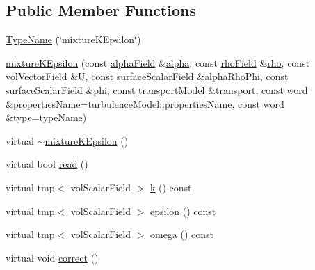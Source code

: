 \subsection*{Public Member Functions}
\begin{DoxyCompactItemize}
\item 
\hyperlink{classFoam_1_1RASModels_1_1mixtureKEpsilon_adbf46a734f80cfe0ac2e8257da209273}{Type\+Name} (\char`\"{}mixture\+K\+Epsilon\char`\"{})
\item 
\hyperlink{classFoam_1_1RASModels_1_1mixtureKEpsilon_a8a7ec1494a8e894fa723875426b4c21b}{mixture\+K\+Epsilon} (const \hyperlink{classFoam_1_1RASModels_1_1mixtureKEpsilon_a06a66094f33d6817d19225445c5ea874}{alpha\+Field} \&\hyperlink{UEqn__1pl_8H_a7fe02434a19f3e00e927f32adcbb193b}{alpha}, const \hyperlink{classFoam_1_1RASModels_1_1mixtureKEpsilon_a1dda906cfc9022335f0782a632302cd8}{rho\+Field} \&\hyperlink{EEqn__1pl_8H_ac955f87ac2b79f02f420cae087fc52b1}{rho}, const vol\+Vector\+Field \&\hyperlink{UEqn__1pl_8H_abe23fa3afe09cc511569a7dca4160561}{U}, const surface\+Scalar\+Field \&\hyperlink{updateAlphaPhiAndInitControls__1p_8H_adb16eab5a684ddb62e40a6ffdc2d646c}{alpha\+Rho\+Phi}, const surface\+Scalar\+Field \&phi, const \hyperlink{classFoam_1_1RASModels_1_1mixtureKEpsilon_ac0a5dc3c45a2d1c61a649bc435a1a48a}{transport\+Model} \&transport, const word \&properties\+Name=turbulence\+Model\+::properties\+Name, const word \&type=type\+Name)
\item 
virtual \hyperlink{classFoam_1_1RASModels_1_1mixtureKEpsilon_ae6ef2c36e578a861d5971b95f45ce9a0}{$\sim$mixture\+K\+Epsilon} ()
\item 
virtual bool \hyperlink{classFoam_1_1RASModels_1_1mixtureKEpsilon_af816873151ddb0126e98bb2f914d8ed5}{read} ()
\item 
virtual tmp$<$ vol\+Scalar\+Field $>$ \hyperlink{classFoam_1_1RASModels_1_1mixtureKEpsilon_a2cc3daa68147a9052c2b37e9ac37eca4}{k} () const
\item 
virtual tmp$<$ vol\+Scalar\+Field $>$ \hyperlink{classFoam_1_1RASModels_1_1mixtureKEpsilon_ad79e047917669fbb490d351478651e20}{epsilon} () const
\item 
virtual tmp$<$ vol\+Scalar\+Field $>$ \hyperlink{classFoam_1_1RASModels_1_1mixtureKEpsilon_a384ad699f7960a8b9686b4a5fe7f3e1a}{omega} () const
\item 
virtual void \hyperlink{classFoam_1_1RASModels_1_1mixtureKEpsilon_a3ae44b28050c3aa494c1d8e18cf618c1}{correct} ()
\end{DoxyCompactItemize}
